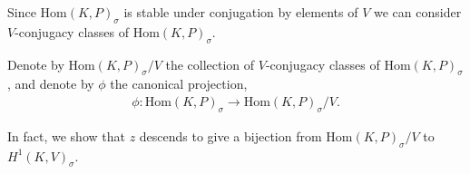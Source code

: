 
Since $\mathrm{Hom}(K, P)_\sigma$ is stable under conjugation by elements of $V$ we can consider $V$-conjugacy classes of $\mathrm{Hom}(K, P)_\sigma$.
\begin{definition} Denote by $\mathrm{Hom}(K, P)_\sigma / V$ the collection of $V$-conjugacy classes of $\mathrm{Hom}(K, P)_\sigma$, and denote by $\phi$ the canonical projection,
\begin{align*} \phi : \mathrm{Hom}(K, P)_\sigma \rightarrow \mathrm{Hom}(K, P)_\sigma / V. \end{align*}
\end{definition}

In fact, we show that $z$ descends to give a bijection from $\mathrm{Hom}(K, P)_\sigma / V$ to $H^1(K, V)_\sigma$.

